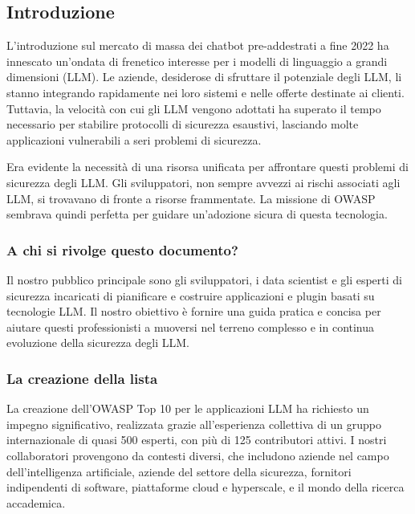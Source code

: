 \documentclass[
]{article}
\author{}
\date{}
\begin{document}
\subsection{Introduzione}\label{introduzione}

L'introduzione sul mercato di massa dei chatbot pre-addestrati a fine
2022 ha innescato un'ondata di frenetico interesse per i modelli di
linguaggio a grandi dimensioni (LLM). Le aziende, desiderose di
sfruttare il potenziale degli LLM, li stanno integrando rapidamente nei
loro sistemi e nelle offerte destinate ai clienti. Tuttavia, la velocità
con cui gli LLM vengono adottati ha superato il tempo necessario per
stabilire protocolli di sicurezza esaustivi, lasciando molte
applicazioni vulnerabili a seri problemi di sicurezza.

Era evidente la necessità di una risorsa unificata per affrontare questi
problemi di sicurezza degli LLM. Gli sviluppatori, non sempre avvezzi ai
rischi associati agli LLM, si trovavano di fronte a risorse frammentate.
La missione di OWASP sembrava quindi perfetta per guidare un'adozione
sicura di questa tecnologia.

\subsubsection{A chi si rivolge questo
documento?}\label{a-chi-si-rivolge-questo-documento}

Il nostro pubblico principale sono gli sviluppatori, i data scientist e
gli esperti di sicurezza incaricati di pianificare e costruire
applicazioni e plugin basati su tecnologie LLM. Il nostro obiettivo è
fornire una guida pratica e concisa per aiutare questi professionisti a
muoversi nel terreno complesso e in continua evoluzione della sicurezza
degli LLM.

\subsubsection{La creazione della lista}\label{la-creazione-della-lista}

La creazione dell'OWASP Top 10 per le applicazioni LLM ha richiesto un
impegno significativo, realizzata grazie all'esperienza collettiva di un
gruppo internazionale di quasi 500 esperti, con più di 125 contributori
attivi. I nostri collaboratori provengono da contesti diversi, che
includono aziende nel campo dell'intelligenza artificiale, aziende del
settore della sicurezza, fornitori indipendenti di software, piattaforme
cloud e hyperscale, e il mondo della ricerca accademica.
\end{document}
